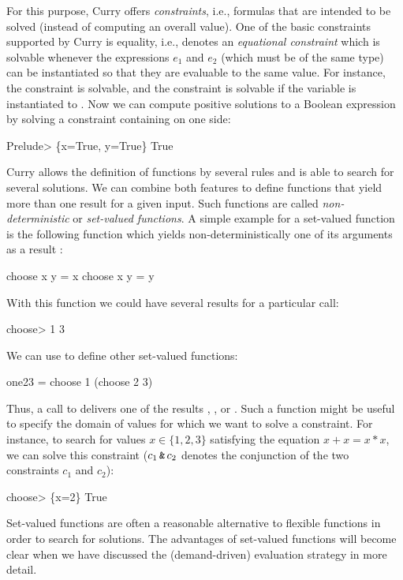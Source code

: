 For this purpose, Curry offers \emph{constraints},
i.e., formulas that are intended to be solved (instead of computing
an overall value). One of the basic constraints supported by Curry
is equality, i.e.,  denotes an
\emph{equational constraint}%
which is solvable whenever the expressions $e_1$ and $e_2$
(which must be of the same type) can be instantiated so that
they are evaluable to the same value. For instance,
the constraint  is solvable, and
the constraint  is solvable if the variable 
is instantiated to . Now we can compute positive solutions
to a Boolean expression by solving a constraint containing 
on one side:
\begin{prog}
Prelude> 
\{x=True, y=True\} True
\end{prog}
Curry allows the definition of functions by several rules
and is able to search for several solutions. We can combine
both features to define functions that yield more than one
result for a given input. Such functions are called
\emph{non-deterministic} or \emph{set-valued functions}.%
%
A simple example for a set-valued function
is the following function  which yields
non-deterministically one of its arguments as a result
:
\begin{prog}
choose x y = x
choose x y = y
\end{prog}
With this function we could have several results for a particular call:
\begin{prog}
choose> 
1
3
\end{prog}
We can use  to define other set-valued functions:
\begin{prog}
one23 = choose 1 (choose 2 3)
\end{prog}
Thus, a call to  delivers one of the results ,
, or . Such a function might be useful
to specify the domain of values for which we want to solve a
constraint. For instance, to search for values $x \in \{1,2,3\}$
satisfying the equation $x+x = x*x$, we can solve
this constraint ($c_1\,\code{\&}\,c_2$ denotes the conjunction
of the two constraints $c_1$ and $c_2$):
\begin{prog}
choose> 
\{x=2\} True
\end{prog}
Set-valued functions are often a reasonable alternative
to flexible functions in order to search for solutions.
The advantages of set-valued functions will become clear
when we have discussed the (demand-driven) evaluation strategy
in more detail.


